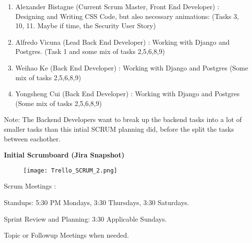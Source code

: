 \documentclass[2pt]{article}
\begin{document}
\begin{flushleft}
\begin{enumerate}
             \item Alexander Bistagne (Current Scrum Master, Front End Developer) : Designing and Writing CSS Code, but also necessary animations: (Tasks 3, 10, 11. Maybe if time, the Security User Story)
            	\item Alfredo Vicuna  (Lead Back End Developer) : Working with Django and Postgres. (Task 1 and some mix of tasks 2,5,6,8,9)
            	\item Weihao Ke (Back End Developer) : Working with Django and Postgres (Some mix of tasks 2,5,6,8,9)
            	\item Yongsheng Cui (Back End Developer) : Working with Django and Postgres (Some mix of tasks 2,5,6,8,9)
        \end{enumerate}
      \item   Note: The Backend Developers want to break up the backend tasks into a lot of smaller tasks than this intial SCRUM planning did, before the split the tasks between eachother.
        \item \item \textbf{Initial Scrumboard (Jira Snapshot)}
        \begin{figure}[h]
            \centering
           \texttt{[image: Trello\_SCRUM\_2.png]}
        \end{figure}   

        \item \item Scrum Meetings :
        \item Standups: 5:30 PM Mondays, 3:30 Thursdays, 3:30 Saturdays.
				\item Sprint Review and Planning: 3:30 Applicable Sundays.
				\item Topic or Followup Meetings when needed.     
    \end{flushleft}
\end{document}
